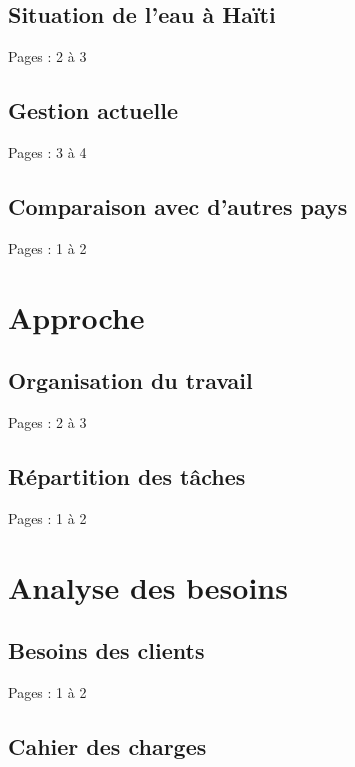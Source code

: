 \documentclass{eplmastersthesis_FR}
\begin{document}
		\section{Situation de l'eau à Haïti}

			Pages : 2 à 3



		\section{Gestion actuelle}

			Pages : 3 à 4

		\section{Comparaison avec d'autres pays}

			Pages : 1 à 2

	\chapter{Approche}

		\section{Organisation du travail}

			Pages : 2 à 3

		\section{Répartition des tâches}

			Pages : 1 à 2


	\chapter{Analyse des besoins}

		\section{Besoins des clients}

			Pages : 1 à 2

		\section{Cahier des charges}
\end{document}
